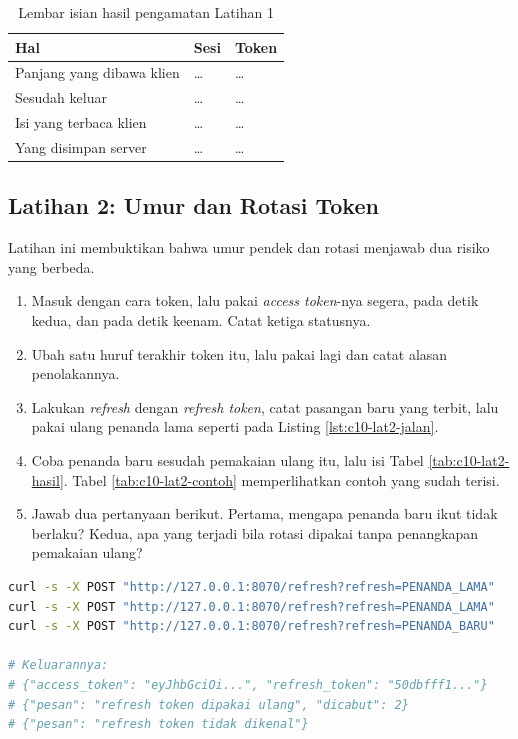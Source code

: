 \begin{table}[!htb]
  \centering
  \caption{Lembar isian hasil pengamatan Latihan 1}
  \label{tab:c10-lat1-hasil}
  \begin{tabularx}{\textwidth}{Xll}
    \hline
    \textbf{Hal} & \textbf{Sesi} & \textbf{Token} \\
    \hline
    Panjang yang dibawa klien & \dots & \dots \\
    \hline
    Sesudah keluar & \dots & \dots \\
    \hline
    Isi yang terbaca klien & \dots & \dots \\
    \hline
    Yang disimpan server & \dots & \dots \\
    \hline
  \end{tabularx}
\end{table}

\subsection*{Latihan 2: Umur dan Rotasi Token}

Latihan ini membuktikan bahwa umur pendek dan rotasi menjawab dua risiko yang
berbeda.

\begin{enumerate}
  \item Masuk dengan cara token, lalu pakai \textit{access token}-nya
        segera, pada detik kedua, dan pada detik keenam. Catat ketiga
        statusnya.
  \item Ubah satu huruf terakhir token itu, lalu pakai lagi dan catat
        alasan penolakannya.
  \item Lakukan \textit{refresh} dengan \textit{refresh token}, catat pasangan baru yang
        terbit, lalu pakai ulang penanda lama seperti pada Listing
        \ref{lst:c10-lat2-jalan}.
  \item Coba penanda baru sesudah pemakaian ulang itu, lalu isi Tabel \ref{tab:c10-lat2-hasil}. Tabel \ref{tab:c10-lat2-contoh}
        memperlihatkan contoh yang sudah terisi.
  \item Jawab dua pertanyaan berikut. Pertama, mengapa penanda baru ikut
        tidak berlaku? Kedua, apa yang terjadi bila rotasi dipakai tanpa penangkapan
        pemakaian ulang?
\end{enumerate}

\begin{lstlisting}[language=bash, caption={Rotasi dan pemakaian ulang refresh token, tersedia di \berkas{sources/chapter10/aplikasi.py}}, label={lst:c10-lat2-jalan}]
curl -s -X POST "http://127.0.0.1:8070/refresh?refresh=PENANDA_LAMA"
curl -s -X POST "http://127.0.0.1:8070/refresh?refresh=PENANDA_LAMA"
curl -s -X POST "http://127.0.0.1:8070/refresh?refresh=PENANDA_BARU"

# Keluarannya:
# {"access_token": "eyJhbGciOi...", "refresh_token": "50dbfff1..."}
# {"pesan": "refresh token dipakai ulang", "dicabut": 2}
# {"pesan": "refresh token tidak dikenal"}
\end{lstlisting}

